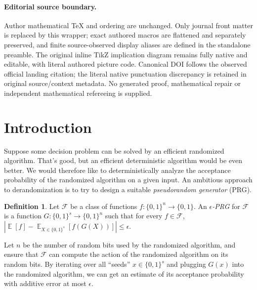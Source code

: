 \documentclass[11pt]{article}
\numberwithin{equation}{section}
\theoremstyle{definition}
\newtheorem{definition}[theorem]{Definition}
\theoremstyle{plain}
\DeclareMathOperator*{\ExpVal}{\mathbb{E}}
\begin{document}
\paragraph{Editorial source boundary.}
Author mathematical TeX and ordering are unchanged. Only journal front matter is replaced by this wrapper; exact authored macros are flattened and separately preserved, and finite source-observed display aliases are defined in the standalone preamble. The original inline TikZ implication diagram remains fully native and editable, with literal authored picture code. Canonical DOI follows the observed official landing citation; the literal native punctuation discrepancy is retained in original source/context metadata. No generated proof, mathematical repair or independent mathematical refereeing is supplied. 
\clearpage

%
%
%
	 	
\section{Introduction} \label{sec:intro}
Suppose some decision problem can be solved by an efficient randomized algorithm. That's good, but an efficient deterministic algorithm would be even better. We would therefore like to deterministically analyze the acceptance probability of the randomized algorithm on a given input. An ambitious approach to derandomization is to try to design a suitable \emph{pseudorandom generator} (PRG).
\begin{definition}
Let $\mathcal{F}$ be a class of functions $f \colon \{0, 1\}^n \to \{0, 1\}$. An \emph{$\epsilon$-PRG} for $\mathcal{F}$ is a function $G \colon \{0, 1\}^s \to \{0, 1\}^n$ such that for every $f \in \mathcal{F}$,
$
\left|\ExpVal[f] - \ExpVal_{X \in \{0, 1\}^s}[f(G(X))]\right| \leq \epsilon.
$
\end{definition}
Let $n$ be the number of random bits used by the randomized algorithm, and ensure that $\mathcal{F}$ can compute the action of the randomized algorithm on its random bits. By iterating over all ``seeds'' $x \in \{0, 1\}^s$ and plugging $G(x)$ into the randomized algorithm, we can get an estimate of its acceptance probability with additive error at most $\epsilon$.
\end{document}

